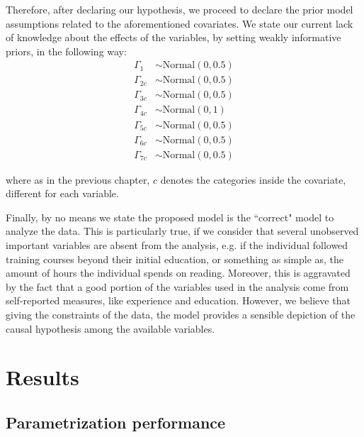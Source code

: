Therefore, after declaring our hypothesis, we proceed to declare the prior model assumptions related to the aforementioned covariates. We state our current lack of knowledge about the effects of the variables, by setting weakly informative priors, in the following way: 
%
\begin{align}
	\Gamma_{1} &\sim \text{Normal}( 0, 0.5 ) \\
	\Gamma_{2c} &\sim \text{Normal}( 0, 0.5 ) \\
	\Gamma_{3c} &\sim \text{Normal}( 0, 0.5 ) \\
	\Gamma_{4c} &\sim \text{Normal}( 0, 1 ) \\
	\Gamma_{5c} &\sim \text{Normal}( 0, 0.5 ) \\
	\Gamma_{6c} &\sim \text{Normal}( 0, 0.5 )  \\
	\Gamma_{7c} &\sim \text{Normal}( 0, 0.5 ) 
\end{align} 

\noindent where as in the previous chapter, $c$ denotes the categories inside the covariate, different for each variable. 

Finally, by no means we state the proposed model is the ``correct" model to analyze the data. This is particularly true, if we consider that several unobserved important variables are absent from the analysis, e.g. if the individual followed training courses beyond their initial education, or something as simple as, the amount of hours the individual spends on reading. Moreover, this is aggravated by the fact that a good portion of the variables used in the analysis come from self-reported measures, like experience and education. However, we believe that giving the constraints of the data, the model provides a sensible depiction of the causal hypothesis among the available variables.


\section{Results}


\subsection{Parametrization performance} \label{sub_sect:ergodicity_application}

